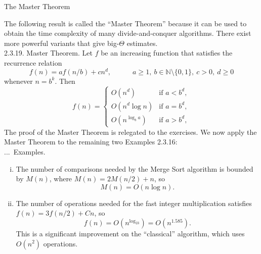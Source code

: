 \documentclass[smaller,hyperref={CJKbookmarks=true}]{beamer}
\newcommand{\N}{\mathbb{N}} \newcommand{\Z}{\mathbb{Z}} \newcommand{\Q}{\mathbb{Q}}
\newcounter{zhuo}[subsection]
\renewcommand{\thezhuo}{\thesection.\thesubsection.\arabic{zhuo}}
\newenvironment{EXAMPLES}{\stepcounter{zhuo}\alert{\!\thezhuo.~Examples.\,}}{}
\begin{document}
\begin{frame}{The Master Theorem}
\begin{spacing}{1}
The following result is called the ``Master Theorem'' because it can be
used to obtain the time complexity of many divide-and-conquer
algorithms. There exist more powerful variants that give big-$\Theta$ estimates.\\[5pt]
\alert{2.3.19. Master Theorem.} Let $f$ be an increasing function that satisfies the recurrence relation
\[f(n)=af(n/b)+cn^d,\qquad\quad a\geq1,~b\in\N\setminus\{0,1\},~c>0,~d\geq0\]
whenever $n=b^k$. Then
\[f(n)=\begin{cases}
         O(n^d)  & \mbox{if } a<b^d, \\
         O(n^d\log n)  & \mbox{if } a=b^d, \\
         O(n^{\log_ba})  & \mbox{if } a>b^d,
       \end{cases}\]
The proof of the Master Theorem is relegated to the exercises.
\newpage
We now apply the Master Theorem to the remaining two Examples 2.3.16:\\[5pt]
\begin{EXAMPLES}
\begin{enumerate}[(i)]
  \item The number of comparisons needed by the Merge Sort algorithm is bounded by $M(n)$, where $M(n)=2M(n/2)+n$, so
      \[M(n)=O(n\log n).\]
  \item The number of operations needed for the fast integer multiplication satisfies $f(n)=3f(n/2)+Cn$, so
      \[f(n)=O(n^{\log_23})=O(n^{1.585}).\]
      This is a significant improvement on the ``classical'' algorithm, which uses $O(n^2)$ operations.
\end{enumerate}
\end{EXAMPLES}
\end{spacing}
\end{frame}
\end{document}
